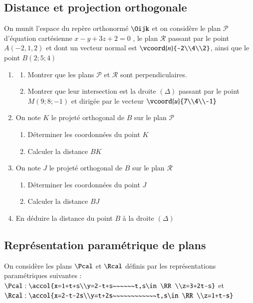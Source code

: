\documentclass[oneside,12pt]{article}          %
\begin{document}
\subsection{Distance et projection orthogonale}
On munit l'espace du repère orthonormé $\Oijk$ et on considère le plan $\mathscr{P}$ d'équation cartésienne $x-y+3z+2=0$ , le plan $\mathscr{R}$ passant par le point $A(-2,1,2)$ et dont un vecteur normal est $\vcoord{n}{-2\\4\\2}$,  ainsi que le point $B(2;5;4)$
\begin{enumerate}
    \item \begin{enumerate}
        \item Montrer que les plans $\mathscr{P}$ et $\mathscr{R}$ sont perpendiculaires.
        \item Montrer que leur intersection est la droite $(\Delta)$ passant par le point $M(9;8;-1)$ et dirigée par le vecteur $\vcoord{u}{7\\4\\-1}$
    \end{enumerate}
    \item On note $K$ le projeté orthogonal de $B$ sur le plan $\mathscr{P}$
    \begin{enumerate}
        \item Déterminer les coordonnées du point $K$
        \item Calculer la distance $BK$
    \end{enumerate}
    \item On note $J$ le projeté orthogonal de $B$ sur le plan $\mathscr{R}$
    \begin{enumerate}
        \item Déterminer les coordonnées du point $J$
        \item Calculer la distance $BJ$
    \end{enumerate}
    \item En déduire la distance du point $B$ à la droite $(\Delta)$
\end{enumerate}



\subsection{Représentation paramétrique de plans}
On considère les plans $\Pcal$ et $\Rcal$ définis par les représentations paramétriques suivantes :\\[5pt]
$\Pcal : \accol{x=1+t+s\\y=2-t+s~~~~~~t,s\in\RR\\z=3+2t-s}$ \hspace{2cm} et \hspace{2cm} $\Rcal : \accol{x=2-t-2s\\y=t+2s~~~~~~~~~~~~t,s\in\RR\\z=1+t-s}$
\end{document}
